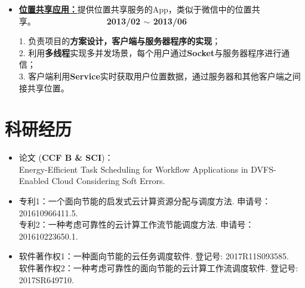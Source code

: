 \documentclass[letterpaper, UTF8, 11pt]{article}
\begin{document}
\begin{itemize}
		
		\item \textbf{\href{https://github.com/Hepsilion/MapProject}{位置共享应用：}}{提供位置共享服务的App，类似于微信中的位置共享。}~~~~~~~~~~~~~~~~~\textbf{2013/02 $\sim$ 2013/06}
		
		1. 负责项目的\textbf{方案设计，客户端与服务器程序的实现}；\\
		2. 利用\textbf{多线程}实现多并发场景，每个用户通过\textbf{Socket}与服务器程序进行通信；\\
		3. 客户端利用\textbf{Service}实时获取用户位置数据，通过服务器和其他客户端之间接共享位置。
		\vspace{0.03in}	
		
		
	\end{itemize}
	\vspace{-0.32in}
	
	\section*{\textbf{科研经历}}\vspace{-0.12in}
	\begin{itemize}	
		\item 论文 (\textbf{CCF B \& SCI})：\\{\small Energy-Efficient Task Scheduling for Workflow Applications in DVFS-Enabled Cloud Considering Soft Errors.} 
		\item 专利1：一个面向节能的启发式云计算资源分配与调度方法. 申请号：201610966411.5.\\
		专利2：一种考虑可靠性的云计算工作流节能调度方法. 申请号：201610223650.1.
		\item 软件著作权1：一种面向节能的云任务调度软件. 登记号: 2017R11S093585.\\
		软件著作权2：一种考虑可靠性的面向节能的云计算工作流调度软件. 登记号: 2017SR649710.
	\end{itemize}
	\vspace{-0.3in}
	
\end{document}
